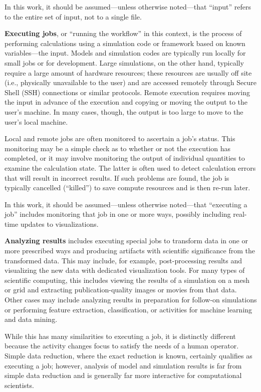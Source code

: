 In this work, it should be assumed---unless otherwise noted---that
``input'' refers to the entire set of input, not to a single file.

\textbf{Executing jobs}, or ``running the workflow'' in this context, is
the process of performing calculations using a simulation code or
framework based on known variables---the input. Models and simulation
codes are typically run locally for small jobs or for development. Large
simulations, on the other hand, typically require a large amount of
hardware resources; these resources are usually off site (i.e.,
physically unavailable to the user) and are accessed remotely
through Secure Shell (SSH) connections or similar protocols. Remote
execution requires moving the input in advance of the execution and
copying or moving the output to the user's machine. In many cases,
though, the output is too large to move to the user's local machine.

Local and remote jobs are often monitored to ascertain a job's status.
This monitoring may be a simple check as to whether or not the execution
has completed, or it may involve monitoring the output of individual
quantities to examine the calculation state. The latter is often used to
detect calculation errors that will result in incorrect results. If such
problems are found, the job is typically cancelled (``killed'') to save
compute resources and is then re-run later.

In this work, it should be assumed---unless otherwise noted---that
``executing a job'' includes monitoring that job in one or more ways,
possibly including real-time updates to visualizations.

\textbf{Analyzing results} includes executing special jobs to transform
data in one or more prescribed ways and producing artifacts with
scientific significance from the transformed data. This may include, for
example, post-processing results and visualizing the new data with
dedicated visualization tools. For many types of scientific computing,
this includes viewing the results of a simulation on a mesh or grid and
extracting publication-quality images or movies from that data. Other
cases may include analyzing results in preparation for follow-on
simulations or performing feature extraction, classification, or
activities for machine learning and data mining.

While this has many similarities to executing a job, it is distinctly
different because the activity changes focus to satisfy the needs of a
human operator. Simple data reduction, where the exact reduction is
known, certainly qualifies as executing a job; however, analysis of
model and simulation results is far from simple data reduction and is
generally far more interactive for computational scientists.

